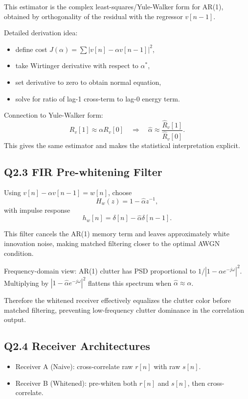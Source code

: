 \documentclass{article}
\begin{document}
This estimator is the complex least-squares/Yule-Walker form for AR(1), obtained by orthogonality of the residual with the regressor $v[n-1]$.

Detailed derivation idea:
\begin{itemize}
\item[$\rightarrow$] define cost $J(\alpha)=\sum |v[n]-\alpha v[n-1]|^2$,
\item[$\rightarrow$] take Wirtinger derivative with respect to $\alpha^*$,
\item[$\rightarrow$] set derivative to zero to obtain normal equation,
\item[$\rightarrow$] solve for ratio of lag-1 cross-term to lag-0 energy term.
\end{itemize}

Connection to Yule-Walker form:
\begin{equation*}
R_v[1] \approx \alpha R_v[0]
\quad\Rightarrow\quad
\hat{\alpha} \approx \frac{\hat{R}_v[1]}{\hat{R}_v[0]}.
\end{equation*}
This gives the same estimator and makes the statistical interpretation explicit.

\subsection*{Q2.3 FIR Pre-whitening Filter}

Using $v[n]-\alpha v[n-1]=w[n]$, choose
\begin{equation*}
H_w(z)=1-\hat{\alpha}z^{-1},
\end{equation*}
with impulse response
\begin{equation*}
h_w[n]=\delta[n]-\hat{\alpha}\delta[n-1].
\end{equation*}

This filter cancels the AR(1) memory term and leaves approximately white innovation noise, making matched filtering closer to the optimal AWGN condition.

Frequency-domain view: AR(1) clutter has PSD proportional to $1/|1-\alpha e^{-j\omega}|^2$. Multiplying by $|1-\hat{\alpha}e^{-j\omega}|^2$ flattens this spectrum when $\hat{\alpha}\approx\alpha$.

Therefore the whitened receiver effectively equalizes the clutter color before matched filtering, preventing low-frequency clutter dominance in the correlation output.

\subsection*{Q2.4 Receiver Architectures}
\begin{itemize}
\item[$\rightarrow$] Receiver A (Naive): cross-correlate raw $r[n]$ with raw $s[n]$.
\item[$\rightarrow$] Receiver B (Whitened): pre-whiten both $r[n]$ and $s[n]$, then cross-correlate.
\end{itemize}
\end{document}
